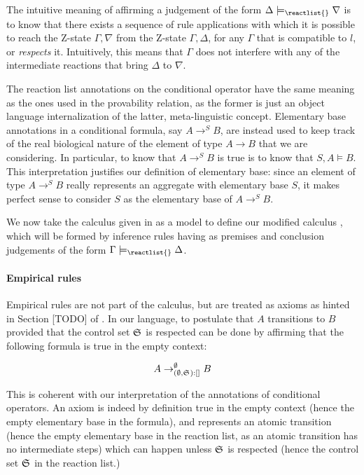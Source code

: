 The intuitive meaning of affirming a judgement of the form
$\Delta \models_{\reactlist{}} \nabla$ is to know that there exists a sequence
of \eznd{} rule applications with which it is possible to reach the Z-state
$\Gamma, \nabla$ from the Z-state $\Gamma, \Delta$, for any $\Gamma$ that is
compatible to $l$, or \emph{respects} it. Intuitively, this means that $\Gamma$
does not interfere with any of the intermediate reactions that bring $\Delta$ to
$\nabla$.

The reaction list annotations on the conditional operator have the same meaning
as the ones used in the provability relation, as the former is just an object
language internalization of the latter, meta-linguistic concept.  Elementary
base annotations in a conditional formula, say $A \rightarrow^S B$, are instead
used to keep track of the real biological nature of the element of type
$A \rightarrow B$ that we are considering.
In particular, to know that $A \rightarrow^S B$ is true is to know that $S, A
\models B$. This interpretation justifies our definition of elementary base:
since an element of type $A \rightarrow^S B$ really represents an aggregate with
elementary base $S$, it makes perfect sense to consider $S$ as the elementary
base of $A \rightarrow^S B$.

We now take the calculus \znd{} given in \cite{adding-logic} as a model to define our
modified calculus \eznd{}, which will be formed by inference rules having as
premises and conclusion judgements of the form
$\Gamma \models_{\reactlist{}} \Delta$.

\paragraph{Empirical rules}

Empirical rules are not part of the calculus, but are treated as axioms as
hinted in Section [TODO] of \cite{adding-logic}. In our language, to postulate
that $A$ transitions to $B$ provided that the control set $\mathfrak{S}_{}$ is
respected can be done by affirming that the following formula is true in the
empty context:

\[
  A \rightarrow_{(\emptyset, \mathfrak{S}_{}):[]}^\emptyset B
\]

This is coherent with our interpretation of the annotations of conditional
operators. An axiom is indeed by definition true in the empty context (hence the
empty elementary base in the formula), and represents an atomic transition
(hence the empty elementary base in the reaction list, as an atomic transition
has no intermediate steps) which can happen unless $\mathfrak{S}_{}$ is respected
(hence the control set $\mathfrak{S}_{}$ in the reaction list.)

